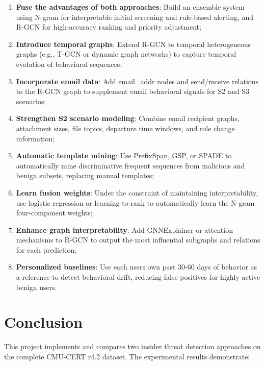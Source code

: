 \documentclass[
  a4paper,
  11pt]{article}
\providecommand{\tightlist}{%
  \setlength{\itemsep}{0pt}\setlength{\parskip}{0pt}}
\begin{document}
\begin{enumerate}
\def\labelenumi{\arabic{enumi}.}
\tightlist
\item
  \textbf{Fuse the advantages of both approaches}: Build an ensemble
  system using N-gram for interpretable initial screening and rule-based
  alerting, and R-GCN for high-accuracy ranking and priority adjustment;
\item
  \textbf{Introduce temporal graphs}: Extend R-GCN to temporal
  heterogeneous graphs (e.g., T-GCN or dynamic graph networks) to
  capture temporal evolution of behavioral sequences;
\item
  \textbf{Incorporate email data}: Add email\_addr nodes and
  send/receive relations to the R-GCN graph to supplement email
  behavioral signals for S2 and S3 scenarios;
\item
  \textbf{Strengthen S2 scenario modeling}: Combine email recipient
  graphs, attachment sizes, file topics, departure time windows, and
  role change information;
\item
  \textbf{Automatic template mining}: Use PrefixSpan, GSP, or SPADE to
  automatically mine discriminative frequent sequences from malicious
  and benign subsets, replacing manual templates;
\item
  \textbf{Learn fusion weights}: Under the constraint of maintaining
  interpretability, use logistic regression or learning-to-rank to
  automatically learn the N-gram four-component weights;
\item
  \textbf{Enhance graph interpretability}: Add GNNExplainer or attention
  mechanisms to R-GCN to output the most influential subgraphs and
  relations for each prediction;
\item
  \textbf{Personalized baselines}: Use each user\textquotesingle s own
  past 30-60 days of behavior as a reference to detect behavioral drift,
  reducing false positives for highly active benign users.
\end{enumerate}

\section{Conclusion}\label{conclusion}

This project implements and compares two insider threat detection
approaches on the complete CMU-CERT r4.2 dataset. The experimental
results demonstrate:
\end{document}
